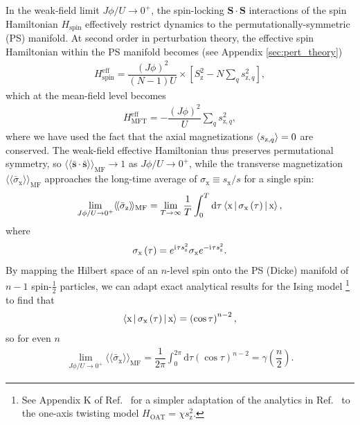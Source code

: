 \documentclass[nofootinbib,twocolumn]{revtex4-2}
\renewcommand{\t}{\text} %
\newcommand{\f}[2]{\dfrac{#1}{#2}} %
\newcommand{\p}[1]{\left(#1\right)} %
\renewcommand{\sp}[1]{\left[#1\right]} %
\newcommand{\bk}{\Braket} %
\renewcommand{\v}{\bm} %
\renewcommand{\c}{\cdot} %
\renewcommand{\dd}{\text{d}} %
\renewcommand{\i}{\mathrm{i}\mkern1mu} %
\newcommand{\bbk}[1]{\langle\!\langle #1 \rangle\!\rangle}
\newcommand{\1}{\mathds{1}}
\newcommand{\x}{\text{x}}
\newcommand{\z}{\text{z}}
\newcommand{\MF}{\text{MF}}
\renewcommand{\ss}{\bar{\v s}\c\bar{\v s}}
\begin{document}
In the weak-field limit $J\phi/U\to0^+$, the spin-locking $\v S\c\v S$ interactions of the spin Hamiltonian $H_{\t{spin}}$ effectively restrict dynamics to the permutationally-symmetric (PS) manifold.
At second order in perturbation theory, the effective spin Hamiltonian within the PS manifold becomes (see Appendix \ref{sec:pert_theory})
\begin{align}
  H_{\t{spin}}^{\t{eff}}
  = \f{\p{J\phi}^2}{\p{N-1}U}
  \times \sp{S_\z^2 - N\sum_q s_{\z,q}^2},
\end{align}
which at the mean-field level becomes
\begin{align}
  H_{\t{MFT}}^{\t{eff}} = -\f{\p{J\phi}^2}{U} \sum_q s_{\z,q}^2,
\end{align}
where we have used the fact that the axial magnetizations $\bk{s_{\z,q}}=0$ are conserved.
The weak-field effective Hamiltonian thus preserves permutational symmetry, so $\bbk{\ss}_\MF\to1$ as $J\phi/U\to0^+$, while the transverse magnetization $\bbk{\bar\sigma_\x}_\MF$ approaches the long-time average of $\sigma_\x\equiv s_\x/s$ for a single spin:
\begin{align}
  \lim_{J\phi/U\to0^+} \bbk{\bar\sigma_\z}_\MF
  = \lim_{T\to\infty} \f1T \int_0^T \dd\tau
  \bk{\x|\sigma_\x\p{\tau}|\x},
\end{align}
where
\begin{align}
  \sigma_\x\p{\tau} = e^{\i\tau s_\z^2} \sigma_\x e^{-\i\tau s_\z^2}.
\end{align}
By mapping the Hilbert space of an $n$-level spin onto the PS (Dicke) manifold of $n-1$ spin-$\frac12$ particles, we can adapt exact analytical results for the Ising model \cite{foss-feig2013nonequilibrium}\footnote{See Appendix K of Ref.~\cite{perlin2020shorttime} for a simpler adaptation of the analytics in Ref.~\cite{foss-feig2013nonequilibrium} to the one-axis twisting model $H_{\t{OAT}}=\chi s_\z^2$.} to find that
\begin{align}
  \bk{\x|\sigma_\x\p{\tau}|\x} = \p{\cos\tau}^{n-2},
\end{align}
so for even $n$
\begin{align}
  \lim_{J\phi/U\to0^+} \bbk{\bar\sigma_\x}_\MF
  = \f1{2\pi} \int_0^{2\pi} \dd\tau \p{\cos\tau}^{n-2}
  = \gamma\p{\f{n}{2}}.
\end{align}


\vspace{3cm}



\onecolumngrid
\appendix

\end{document}
